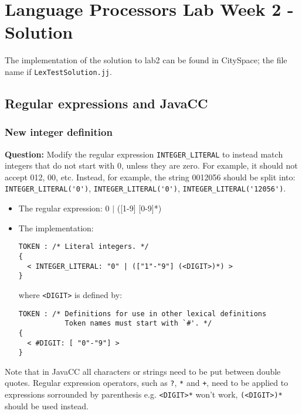 \documentclass{article}
\begin{document}
\thispagestyle{empty}

\newcommand{\negra}[1]{\textbf{#1}}

\section*{Language Processors Lab Week 2 - Solution}


\medskip\noindent The implementation of the solution to lab2 can be found in CitySpace; the file name if {\tt LexTestSolution.jj}. 

\subsection*{Regular expressions and JavaCC}

\subsubsection*{New integer definition}

\textbf{Question:} Modify the regular expression \verb+INTEGER_LITERAL+ to instead match integers that do not start with 0, unless they are zero. For example, it should not accept 012, 00, etc. Instead, for example, the string 0012056 should be split into: \\
\verb+INTEGER_LITERAL('0')+, \verb+INTEGER_LITERAL('0')+, \verb+INTEGER_LITERAL('12056')+.

\begin{itemize}

\item The regular expression: 0 $|$ ([1-9] [0-9]*) \\

\item The implementation:

\begin{verbatim}
TOKEN : /* Literal integers. */
{
  < INTEGER_LITERAL: "0" | (["1"-"9"] (<DIGIT>)*) >
}
\end{verbatim}
where \verb+<DIGIT>+ is defined by:
\begin{verbatim}
TOKEN : /* Definitions for use in other lexical definitions 
           Token names must start with `#'. */
{
  < #DIGIT: [ "0"-"9"] >
}
\end{verbatim}

\end{itemize}

Note that in JavaCC all characters or strings need to be put between double quotes. Regular expression operators, such as \verb+?+, \verb+*+ and \verb-+-, need to be applied to expressions sorrounded by parenthesis e.g. \verb+<DIGIT>*+ won't work, \verb+(<DIGIT>)*+ should be used instead.
\end{document}
